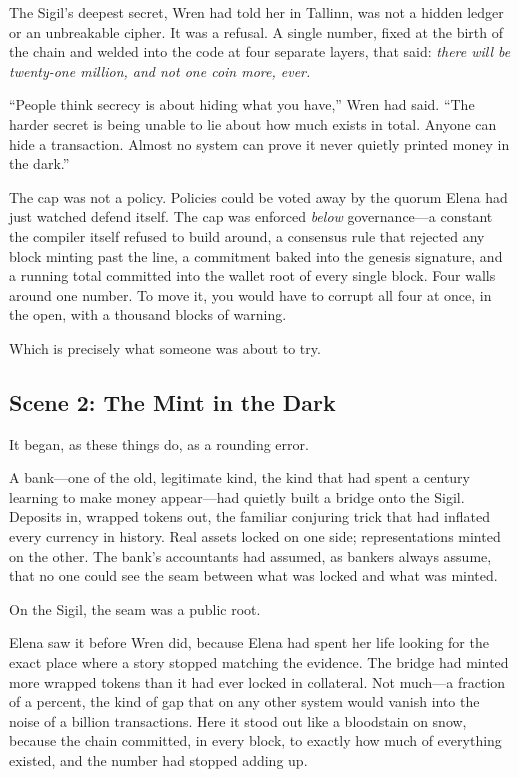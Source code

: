 \documentclass[12pt,letterpaper]{book}
\begin{document}
The Sigil's deepest secret, Wren had told her in Tallinn, was not a hidden
ledger or an unbreakable cipher. It was a refusal. A single number, fixed at the
birth of the chain and welded into the code at four separate layers, that said:
\emph{there will be twenty-one million, and not one coin more, ever.}

``People think secrecy is about hiding what you have,'' Wren had said. ``The
harder secret is being unable to lie about how much exists in total. Anyone can
hide a transaction. Almost no system can prove it never quietly printed money in
the dark.''

The cap was not a policy. Policies could be voted away by the quorum Elena had
just watched defend itself. The cap was enforced \emph{below} governance---a
constant the compiler itself refused to build around, a consensus rule that
rejected any block minting past the line, a commitment baked into the genesis
signature, and a running total committed into the wallet root of every single
block. Four walls around one number. To move it, you would have to corrupt all
four at once, in the open, with a thousand blocks of warning.

Which is precisely what someone was about to try.

\hypertarget{scene-2-the-mint-in-the-dark}{%
\subsection{Scene 2: The Mint in the
Dark}\label{scene-2-the-mint-in-the-dark}}

It began, as these things do, as a rounding error.

A bank---one of the old, legitimate kind, the kind that had spent a century
learning to make money appear---had quietly built a bridge onto the Sigil.
Deposits in, wrapped tokens out, the familiar conjuring trick that had inflated
every currency in history. Real assets locked on one side; representations
minted on the other. The bank's accountants had assumed, as bankers always
assume, that no one could see the seam between what was locked and what was
minted.

On the Sigil, the seam was a public root.

Elena saw it before Wren did, because Elena had spent her life looking for the
exact place where a story stopped matching the evidence. The bridge had minted
more wrapped tokens than it had ever locked in collateral. Not much---a
fraction of a percent, the kind of gap that on any other system would vanish
into the noise of a billion transactions. Here it stood out like a bloodstain
on snow, because the chain committed, in every block, to exactly how much of
everything existed, and the number had stopped adding up.
\end{document}

